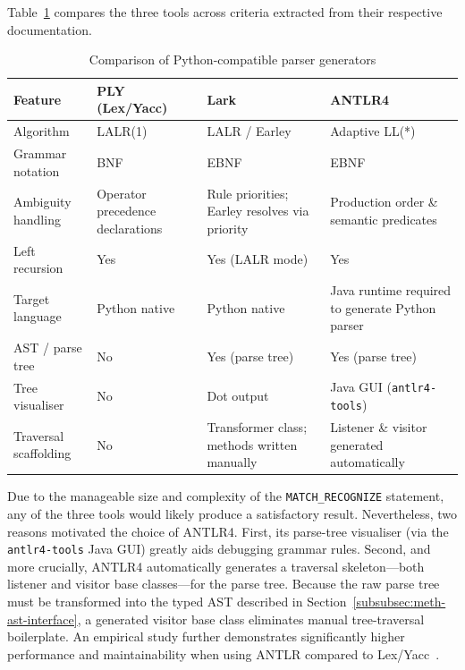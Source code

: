 Table~\ref{tab:parser-gen-comparison} compares the three tools
across criteria extracted from their respective documentation.

\begin{table}[htbp]
  \centering
  \small
  \caption{Comparison of Python-compatible parser generators}
  \label{tab:parser-gen-comparison}
  \begin{tabular}{p{2.8cm} p{3.0cm} p{3.0cm} p{3.0cm}}
    \toprule
    \textbf{Feature}
      & \textbf{PLY (Lex/Yacc)}
      & \textbf{Lark}
      & \textbf{ANTLR4} \\
    \midrule
    Algorithm
      & LALR(1)
      & LALR / Earley
      & Adaptive LL(*) \cite{parr2014adaptive} \\[4pt]
    Grammar notation
      & BNF
      & EBNF
      & EBNF \\[4pt]
    Ambiguity handling
      & Operator precedence declarations
      & Rule priorities; Earley resolves via priority
      & Production order \& semantic predicates \\[4pt]
    Left recursion
      & Yes
      & Yes (LALR mode)
      & Yes \\[4pt]
    Target language
      & Python native
      & Python native
      & Java runtime required to generate Python parser \\[4pt]
    AST / parse tree
      & No
      & Yes (parse tree)
      & Yes (parse tree) \\[4pt]
    Tree visualiser
      & No
      & Dot output
      & Java GUI (\texttt{antlr4-tools}) \\[4pt]
    Traversal scaffolding
      & No
      & Transformer class; methods written manually
      & Listener \& visitor generated automatically \\
    \bottomrule
  \end{tabular}
\end{table}

Due to the manageable size and complexity of the
\texttt{MATCH\_RECOGNIZE} statement, any of the three tools would
likely produce a satisfactory result.  Nevertheless, two reasons
motivated the choice of ANTLR4.  First, its parse-tree visualiser
(via the \texttt{antlr4-tools} Java GUI) greatly aids debugging
grammar rules.  Second, and more crucially, ANTLR4 automatically
generates a traversal skeleton---both listener and visitor base
classes---for the parse tree.  Because the raw parse tree must be
transformed into the typed AST described in
Section~\ref{subsubsec:meth-ast-interface}, a generated visitor
base class eliminates manual tree-traversal boilerplate.  An
empirical study further demonstrates significantly higher
performance and maintainability when using ANTLR compared to
Lex/Yacc~\cite{antlr_performance}.


